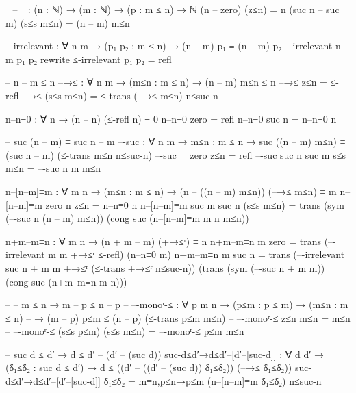 \documentclass{article}
\begin{document}
\begin{prev}
\begin{code}
_–_ : (n : ℕ) → (m : ℕ) → (p : m ≤ n) → ℕ
(n – zero) (z≤n) = n
(suc n – suc m) (s≤s m≤n) = (n – m) m≤n

–-irrelevant : ∀ {n m} → (p₁ p₂ : m ≤ n) → (n – m) p₁ ≡ (n – m) p₂
–-irrelevant {n} {m} p₁ p₂ rewrite ≤-irrelevant p₁ p₂ = refl

-- n – m ≤ n
–→≤ : ∀ {n m} → (m≤n : m ≤ n) → (n – m) m≤n ≤ n
–→≤ z≤n = ≤-refl
–→≤ (s≤s m≤n) = ≤-trans (–→≤ m≤n) n≤suc-n

n–n≡0 : ∀ {n} → (n – n) (≤-refl {n}) ≡ 0
n–n≡0 {zero} = refl
n–n≡0 {suc n} = n–n≡0 {n}

-- suc (n – m) ­≡ suc n – m
–-suc : ∀ {n m} → {m≤n : m ≤ n} 
            → suc ((n – m) m≤n) ≡ (suc n – m) (≤-trans m≤n n≤suc-n)
–-suc {_} {zero} {z≤n} = refl
–-suc {suc n} {suc m} {s≤s m≤n} = –-suc {n} {m} {m≤n}

n–[n–m]≡m : ∀ {m n} → (m≤n : m ≤ n) 
                → (n – ((n – m) m≤n)) (–→≤ m≤n) ≡ m 
n–[n–m]≡m {zero} {n} z≤n = n–n≡0 {n}
n–[n–m]≡m {suc m} {suc n} (s≤s m≤n) = 
    trans (sym (–-suc {n} {(n – m) m≤n})) 
            (cong suc (n–[n–m]≡m {m} {n} m≤n))

n+m–m≡n : ∀ {m n} → (n + m – m) (+→≤ʳ) ≡ n
n+m–m≡n {m} {zero} = 
    trans (–-irrelevant {m} {m} +→≤ʳ ≤-refl) (n–n≡0 {m})
n+m–m≡n {m} {suc n} = 
    trans 
        (–-irrelevant {suc n + m} {m} +→≤ʳ (≤-trans +→≤ʳ n≤suc-n)) 
        (trans (sym (–-suc {n + m} {m})) 
                (cong suc (n+m–m≡n {m} {n})))

-- -- m ≤ n → m – p ≤ n – p
-- –-monoʳ-≤ : ∀ {p m n} → (p≤m : p ≤ m) → (m≤n : m ≤ n) 
--                 → (m – p) p≤m ≤ (n – p) (≤-trans p≤m m≤n)
-- –-monoʳ-≤ z≤n m≤n = m≤n
-- –-monoʳ-≤ (s≤s p≤m) (s≤s m≤n) = –-monoʳ-≤ p≤m m≤n

-- suc d ≤ d′ → d ≤ d′ – (d′ – (suc d))
suc-d≤d′→d≤d′–[d′–[suc-d]] : ∀ {d d′} → (δ₁≤δ₂ : suc d ≤ d′) 
            → d ≤ ((d′ – ((d′ – (suc d)) δ₁≤δ₂)) (–→≤ δ₁≤δ₂))
suc-d≤d′→d≤d′–[d′–[suc-d]] δ₁≤δ₂ = 
            m≡n,p≤n→p≤m (n–[n–m]≡m δ₁≤δ₂) n≤suc-n
\end{code}
\end{prev}
\end{document}
